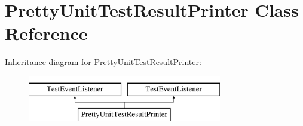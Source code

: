 \hypertarget{classtesting_1_1internal_1_1PrettyUnitTestResultPrinter}{\section{\-Pretty\-Unit\-Test\-Result\-Printer \-Class \-Reference}
\label{d6/d49/classtesting_1_1internal_1_1PrettyUnitTestResultPrinter}
}
\-Inheritance diagram for \-Pretty\-Unit\-Test\-Result\-Printer\-:\begin{figure}[H]
\begin{center}
\leavevmode
\includegraphics[height=2.000000cm]{d6/d49/classtesting_1_1internal_1_1PrettyUnitTestResultPrinter}
\end{center}
\end{figure}
